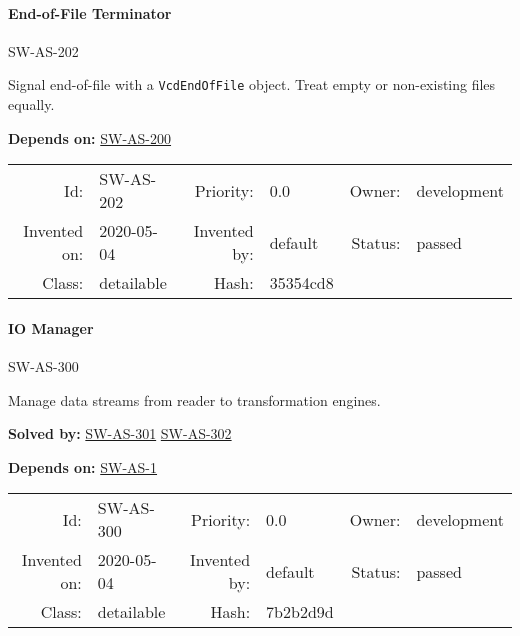\paragraph{End-of-File Terminator}

\hypertarget{SW-AS-202}{SW-AS-202} 
\label{SW-AS-202}

Signal end-of-file with a \texttt{VcdEndOfFile} object.  Treat empty or non-existing files equally.







 \textbf{Depends on:}
 \hyperlink{SW-AS-200}{SW-AS-200} 




\par{\small \begin{center}
\begin{tabular}{rlrlrl}
   Id: & SW-AS-202               & Priority: & 0.0          & Owner: & development \\
   Invented on: & 2020-05-04 & Invented by: & default & Status: & passed \\
   Class: & detailable & Hash: & 35354cd8
\end{tabular}\end{center}
}

\paragraph{IO Manager}

\hypertarget{SW-AS-300}{SW-AS-300} 
\label{SW-AS-300}

Manage data streams from reader to transformation engines.





 \textbf{Solved by:}
 \hyperlink{SW-AS-301}{SW-AS-301}  \hyperlink{SW-AS-302}{SW-AS-302} 


 \textbf{Depends on:}
 \hyperlink{SW-AS-1}{SW-AS-1} 




\par{\small \begin{center}
\begin{tabular}{rlrlrl}
   Id: & SW-AS-300               & Priority: & 0.0          & Owner: & development \\
   Invented on: & 2020-05-04 & Invented by: & default & Status: & passed \\
   Class: & detailable & Hash: & 7b2b2d9d
\end{tabular}\end{center}
}

